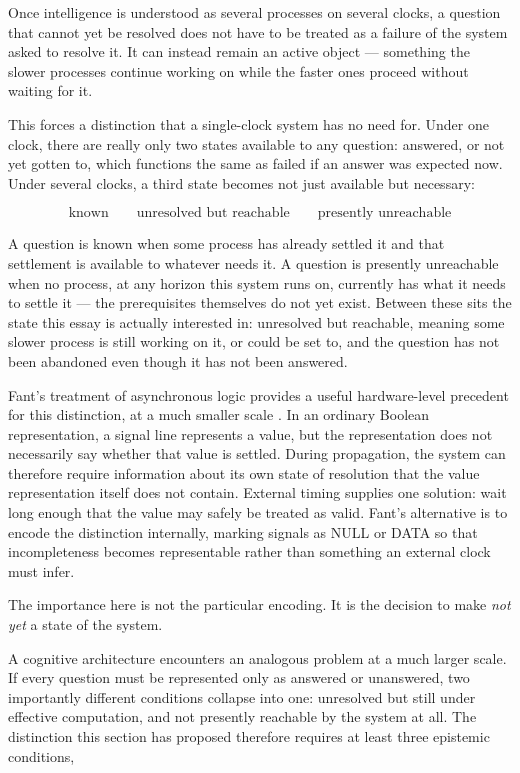 \documentclass[11pt]{article}
\begin{document}
Once intelligence is understood as several processes on several clocks, a question that cannot yet be resolved does not have to be treated as a failure of the system asked to resolve it. It can instead remain an active object --- something the slower processes continue working on while the faster ones proceed without waiting for it.

This forces a distinction that a single-clock system has no need for. Under one clock, there are really only two states available to any question: answered, or not yet gotten to, which functions the same as failed if an answer was expected now. Under several clocks, a third state becomes not just available but necessary:

\[
\text{known} \qquad \text{unresolved but reachable} \qquad \text{presently unreachable}
\]

A question is known when some process has already settled it and that settlement is available to whatever needs it. A question is presently unreachable when no process, at any horizon this system runs on, currently has what it needs to settle it --- the prerequisites themselves do not yet exist. Between these sits the state this essay is actually interested in: unresolved but reachable, meaning some slower process is still working on it, or could be set to, and the question has not been abandoned even though it has not been answered.

Fant's treatment of asynchronous logic provides a useful hardware-level precedent for this distinction, at a much smaller scale \cite{fant2007}. In an ordinary Boolean representation, a signal line represents a value, but the representation does not necessarily say whether that value is settled. During propagation, the system can therefore require information about its own state of resolution that the value representation itself does not contain. External timing supplies one solution: wait long enough that the value may safely be treated as valid. Fant's alternative is to encode the distinction internally, marking signals as NULL or DATA so that incompleteness becomes representable rather than something an external clock must infer.

The importance here is not the particular encoding. It is the decision to make \emph{not yet} a state of the system.

A cognitive architecture encounters an analogous problem at a much larger scale. If every question must be represented only as answered or unanswered, two importantly different conditions collapse into one: unresolved but still under effective computation, and not presently reachable by the system at all. The distinction this section has proposed therefore requires at least three epistemic conditions,
\end{document}
